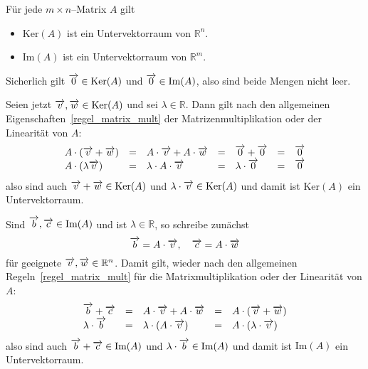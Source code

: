 \begin{satz} Für jede $m \times n$--Matrix $A$ gilt

\begin{itemize} 
\item $\textrm{Ker}(A)$ ist ein Untervektorraum von $\mathbb R^n$.
\item $\textrm{Im}(A)$ ist ein Untervektorraum von $\mathbb R^m$.
\end{itemize}
\end{satz}

\beweis Sicherlich gilt $\overrightarrow{0} \in \textrm{Ker}(A)$ und 
$\overrightarrow{0} \in \textrm{Im}(A)$, also sind beide Mengen nicht leer.

Seien jetzt $\overrightarrow{v}, \overrightarrow{w} \in \textrm{Ker}(A)$ und sei 
$\lambda \in \mathbb R$. Dann gilt nach den allgemeinen 
Eigenschaften~\ref{regel_matrix_mult} der Matrizenmultiplikation oder der Linearität 
von $A$:
  	$$ \begin{array} {l c l c l c l}
   	A\cdot\left(\overrightarrow{v} + \overrightarrow{w}\right) & = & 
   	A\cdot \overrightarrow{v} + A \cdot \overrightarrow{w} & = & 
   	\overrightarrow{0} + \overrightarrow{0} & = & \overrightarrow{0} \\
   	A \cdot \left( \lambda \overrightarrow{v} \right) & = & 
   	\lambda \cdot A \cdot \overrightarrow{v} & = & 
   	\lambda \cdot \overrightarrow{0} & = & \overrightarrow{0}
   	\end{array} $$
also sind auch $\overrightarrow{v} + \overrightarrow{w} \in \textrm{Ker}(A)$ und 
$\lambda \cdot \overrightarrow{v} \in \textrm{Ker}(A)$ und damit ist 
$\textrm{Ker}(A)$ ein Untervektorraum. 

Sind $\overrightarrow{b}, \overrightarrow{c} \in \textrm{Im}(A) $ und ist $\lambda 
\in \mathbb R$, so schreibe zunächst
  	$$ \overrightarrow{b} = A \cdot \overrightarrow{v}, \quad 
 	\overrightarrow{c} = A \cdot \overrightarrow{w} $$
für geeignete $\overrightarrow{v}, \overrightarrow{w} \in \mathbb R^n$. Damit gilt, 
wieder nach den allgemeinen Regeln~\ref{regel_matrix_mult} für die 
Matrixmultiplikation oder der Linearität von $A$:
  	$$ \begin{array} { l c l c l}
  	\overrightarrow{b} + \overrightarrow{c} & = & 
  	A \cdot \overrightarrow{v} + A \cdot \overrightarrow{w} & = & 
  	A \cdot \left( \overrightarrow{v} + \overrightarrow{w} \right) \\
  	\lambda \cdot \overrightarrow{b} & = & 
  	\lambda \cdot \left(A \cdot \overrightarrow{v}\right) & = & 
  	A \cdot \left( \lambda \cdot \overrightarrow{v} \right)
  	\end{array} $$
also sind auch $\overrightarrow{b} + \overrightarrow{c} \in \textrm{Im}(A)$ und 
$\lambda \cdot \overrightarrow{b} \in \textrm{Im}(A)$ und damit ist 
$\textrm{Im}(A)$ ein Untervektorraum.

